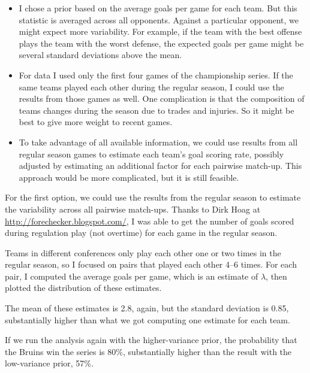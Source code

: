 \documentclass[12pt]{book}
\theoremstyle{exercise}
\begin{document}
\begin{itemize}

\item I chose a prior based on the average goals per game for each
  team.  But this statistic is averaged across all opponents.  Against
  a particular opponent, we might expect more variability.  For
  example, if the team with the best offense plays the team with the
  worst defense, the expected goals per game might be several standard
  deviations above the mean.

\item For data I used only the first four games of the championship
  series.  If the same teams played each other during the
  regular season, I could use the results from those games as well.
  One complication is that the composition of teams changes during
  the season due to trades and injuries.  So it might be best to
  give more weight to recent games.

\item To take advantage of all available information, we could
  use results from all regular season games to estimate each team's
  goal scoring rate, possibly adjusted by estimating
  an additional factor for each pairwise match-up.  This approach
  would be more complicated, but it is still feasible.

\end{itemize}

For the first option, we could use the results from the regular season
to estimate the variability across all pairwise match-ups.  Thanks to
Dirk Hoag at \url{http://forechecker.blogspot.com/}, I was able to get
the number of goals scored during regulation play (not overtime) for
each game in the regular season.

Teams in different conferences only play each other one or two
times in the regular season, so I focused on pairs that played
each other 4--6 times.  For each pair, I computed the average
goals per game, which is an estimate of $\lambda$, then plotted
the distribution of these estimates.

The mean of these estimates is 2.8, again, but the standard
deviation is 0.85, substantially higher than what we got computing
one estimate for each team.

If we run the analysis again with the higher-variance prior, the
probability that the Bruins win the series is 80\%, substantially
higher than the result with the low-variance prior, 57\%.
\end{document}
